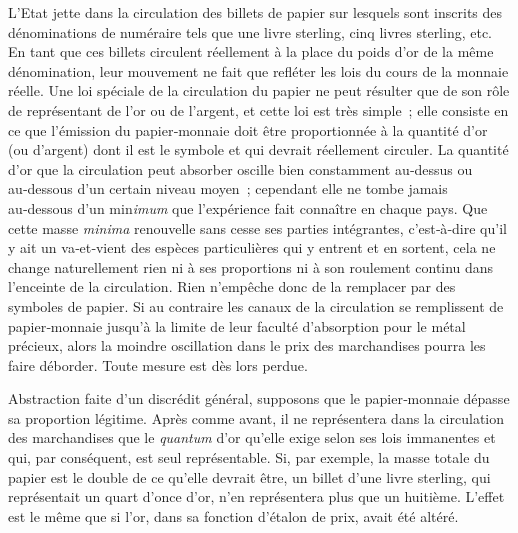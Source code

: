 \documentclass[french,twoside]{book} %
\begin{document}
L’Etat jette dans la circulation des billets de papier sur lesquels sont inscrits des dénominations de numéraire tels que une livre sterling, cinq livres sterling, etc. En tant que ces billets circulent réellement à la place du poids d’or de la même dénomination, leur mouvement ne fait que refléter les lois du cours de la monnaie réelle. Une loi spéciale de la circulation du papier ne peut résulter que de son rôle de représentant de l’or ou de l’argent, et cette loi est très simple ; elle consiste en ce que l’émission du papier‑monnaie doit être proportionnée à la quantité d’or (ou d’argent) dont il est le symbole et qui devrait réellement circuler. La quantité d’or que la circulation peut absorber oscille bien constamment au‑dessus ou au‑dessous d’un certain niveau moyen ; cependant elle ne tombe jamais au‑dessous d’un min\emph{imum} que l’expérience fait connaître en chaque pays. Que cette masse \emph{minima} renouvelle sans cesse ses parties intégrantes, c’est‑à‑dire qu’il y ait un va‑et‑vient des espèces particulières qui y entrent et en sortent, cela ne change naturellement rien ni à ses proportions ni à son roulement continu dans l’enceinte de la circulation. Rien n’empêche donc de la remplacer par des symboles de papier. Si au contraire les canaux de la circulation se remplissent de papier‑monnaie jusqu’à la limite de leur faculté d’absorption pour le métal précieux, alors la moindre oscillation dans le prix des marchandises pourra les faire déborder. Toute mesure est dès lors perdue.\par
Abstraction faite d’un discrédit général, supposons que le papier‑monnaie dépasse sa proportion légitime. Après comme avant, il ne représentera dans la circulation des marchandises que le \emph{quantum} d’or qu’elle exige selon ses lois immanentes et qui, par conséquent, est seul représentable. Si, par exemple, la masse totale du papier est le double de ce qu’elle devrait être, un billet d’une livre sterling, qui représentait un quart d’once d’or, n’en représentera plus que un huitième. L’effet est le même que si l’or, dans sa fonction d’étalon de prix, avait été altéré.\par
\end{document}
